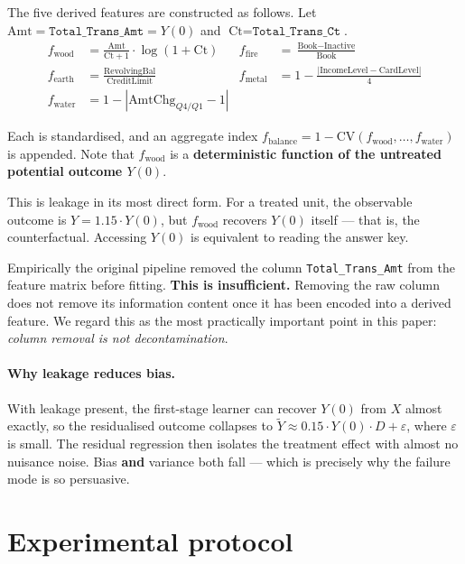 \documentclass[11pt]{article}
\begin{document}
The five derived features are constructed as follows. Let $\text{Amt} = \texttt{Total\_Trans\_Amt} = Y(0)$ and $\text{Ct} = \texttt{Total\_Trans\_Ct}$.
\begin{align}
f_{\text{wood}} &= \frac{\text{Amt}}{\text{Ct} + 1} \cdot \log(1 + \text{Ct}) & f_{\text{fire}} &= \frac{\text{Book} - \text{Inactive}}{\text{Book}} \\
f_{\text{earth}} &= \frac{\text{RevolvingBal}}{\text{CreditLimit}} & f_{\text{metal}} &= 1 - \frac{|\text{IncomeLevel} - \text{CardLevel}|}{4}\\
f_{\text{water}} &= 1 - |\text{AmtChg}_{Q4/Q1} - 1| & &
\end{align}

Each is standardised, and an aggregate index $f_{\text{balance}} = 1 - \mathrm{CV}(f_{\text{wood}}, \ldots, f_{\text{water}})$ is appended. Note that $f_{\text{wood}}$ is a \textbf{deterministic function of the untreated potential outcome $Y(0)$}.

This is leakage in its most direct form. For a treated unit, the observable outcome is $Y = 1.15 \cdot Y(0)$, but $f_{\text{wood}}$ recovers $Y(0)$ itself --- that is, the counterfactual. Accessing $Y(0)$ is equivalent to reading the answer key.

Empirically the original pipeline removed the column \texttt{Total\_Trans\_Amt} from the feature matrix before fitting. \textbf{This is insufficient.} Removing the raw column does not remove its information content once it has been encoded into a derived feature. We regard this as the most practically important point in this paper: \emph{column removal is not decontamination}.

\paragraph{Why leakage reduces bias.}
With leakage present, the first-stage learner can recover $Y(0)$ from $X$ almost exactly, so the residualised outcome collapses to $\tilde{Y} \approx 0.15 \cdot Y(0) \cdot D + \varepsilon$, where $\varepsilon$ is small. The residual regression then isolates the treatment effect with almost no nuisance noise. Bias \textbf{and} variance both fall --- which is precisely why the failure mode is so persuasive.

\section{Experimental protocol}
\end{document}
